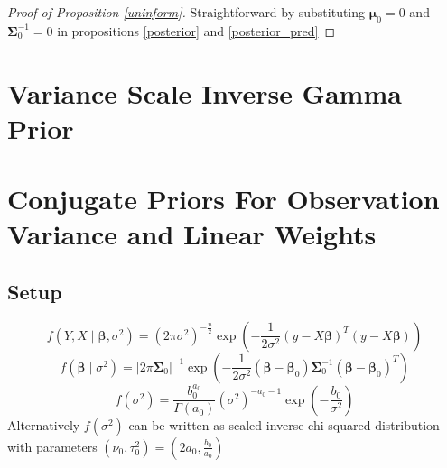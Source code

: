 \documentclass[10pt,fleqn]{amsart}
\theoremstyle{definition}
\theoremstyle{remark}
\numberwithin{equation}{section}
\newcommand{\bbeta}{\boldsymbol{\beta}}
\newcommand{\mmu}{\boldsymbol{\mu}}
\newcommand{\SSigma}{\boldsymbol{\Sigma}}
\begin{document}
\begin{proof}[Proof of Proposition \ref{uninform}]
Straightforward by substituting $\mmu_0=0$ and $\SSigma_0^{-1}=0$ in propositions \ref{posterior} and \ref{posterior_pred}
\end{proof}


\section{Variance Scale Inverse Gamma Prior}


\section{Conjugate Priors For Observation Variance and Linear Weights}
\subsection{Setup}
\begin{equation}
    f(Y,X\mid \bbeta,\sigma^2) = \left(2\pi\sigma^2\right)^{-\frac{n}{2}}
    \exp\left(-\frac{1}{2\sigma^2}(y-X\bbeta)^T(y-X\bbeta)\right)
\end{equation}
\begin{equation}
    f(\bbeta\mid\sigma^2)=\lvert2\pi\SSigma_0\rvert^{-1}
    \exp\left(-\frac{1}{2\sigma^2}(\bbeta-\bbeta_0)\SSigma_0^{-1}(\bbeta-\bbeta_0)^T\right)
\end{equation}
\begin{equation}
    f(\sigma^2)=\frac{b_0^{a_0}}{\Gamma(a_0)}(\sigma^2)^{-a_0-1}\exp\left(-\frac{b_0}{\sigma^2}\right)
\end{equation}
Alternatively $f(\sigma^2)$ can be written as scaled inverse chi-squared distribution
with parameters $\left(\nu_0,\tau_0^2\right)=\left(2a_0,\frac{b_0}{a_0}\right)$
\end{document}
